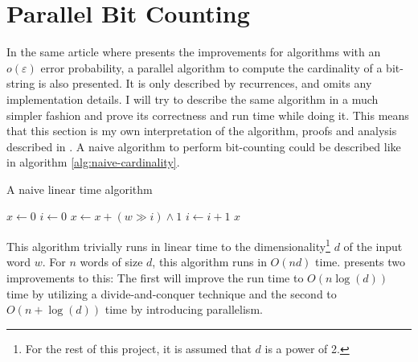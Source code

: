 \section{Parallel Bit Counting}
In the same article where \citet{fast-similarity-search} presents the improvements for algorithms with an $o(\varepsilon)$ error probability, a parallel algorithm to compute the cardinality of a bit-string is also presented. It is only described by recurrences, and omits any implementation details. I will try to describe the same algorithm in a much simpler fashion and prove its correctness and run time while doing it. This means that this section is my own interpretation of the algorithm, proofs and analysis described in \cite{fast-similarity-search}.
A naive algorithm to perform bit-counting could be described like in algorithm \ref{alg:naive-cardinality}.
\begin{algorithm}[H]
\caption{A naive linear time algorithm}\label{alg:naive-cardinality}
\begin{algorithmic}[1]
 
\State $x \gets 0$
\State $i \gets 0$
\State $x \gets x + (w \gg i) \land 1$
\State $i \gets i + 1$
\EndWhile
\State \Return $x$
\EndFunction
\end{algorithmic}
\end{algorithm}
This algorithm trivially runs in linear time to the dimensionality\footnote{For the rest of this project, it is assumed that $d$ is a power of 2.} $d$ of the input word $w$. For $n$ words of size $d$, this algorithm runs in $O(nd)$ time.
\citet{fast-similarity-search} presents two improvements to this: The first will improve the run time to $O(n\log(d))$ time by utilizing a divide-and-conquer technique and the second to $O(n + \log(d))$ time by introducing parallelism.
